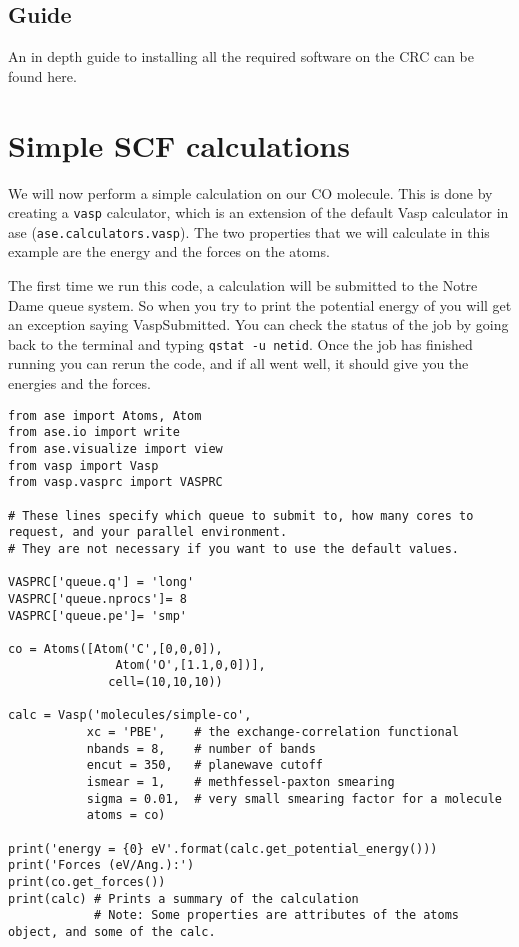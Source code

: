\documentclass[11pt]{article}
\begin{document}
\subsection{Guide}
\label{sec:org23a38ce}
An in depth guide to installing all the required software on the CRC can be found here.
\section{Simple SCF calculations}
\label{sec:org966ab3b}

We will now perform a simple calculation on our CO molecule. This is done by creating a \texttt{vasp} calculator, which is an extension of the default Vasp calculator in ase (\texttt{ase.calculators.vasp}). The two properties that we will calculate in this example are the energy and the forces on the atoms. 

The first time we run this code, a calculation will be submitted to the Notre Dame queue system. So when you try to print the potential energy of you will get an exception saying VaspSubmitted. You can check the status of the job by going back to the terminal and typing \texttt{qstat -u netid}. Once the job has finished running you can rerun the code, and if all went well, it should give you the energies and the forces.

\begin{verbatim}
from ase import Atoms, Atom
from ase.io import write
from ase.visualize import view
from vasp import Vasp
from vasp.vasprc import VASPRC

# These lines specify which queue to submit to, how many cores to request, and your parallel environment.
# They are not necessary if you want to use the default values.

VASPRC['queue.q'] = 'long'
VASPRC['queue.nprocs']= 8
VASPRC['queue.pe']= 'smp'

co = Atoms([Atom('C',[0,0,0]),
               Atom('O',[1.1,0,0])],
              cell=(10,10,10))

calc = Vasp('molecules/simple-co',
           xc = 'PBE',    # the exchange-correlation functional
           nbands = 8,    # number of bands
           encut = 350,   # planewave cutoff
           ismear = 1,    # methfessel-paxton smearing
           sigma = 0.01,  # very small smearing factor for a molecule
           atoms = co)

print('energy = {0} eV'.format(calc.get_potential_energy()))
print('Forces (eV/Ang.):')
print(co.get_forces())
print(calc) # Prints a summary of the calculation
            # Note: Some properties are attributes of the atoms object, and some of the calc. 
\end{verbatim}
\end{document}
